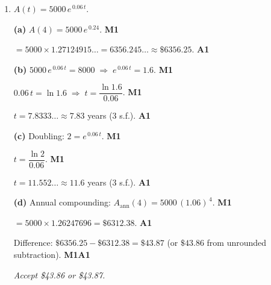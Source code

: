 \documentclass[12pt, twoside]{article}
\begin{document}
\begin{enumerate}[itemsep=0.3cm]
\textbf{(c)} $N(5) = 250\, e^{\,5k} = 250 \cdot 4^{\,5/3}$.
\hfill \textbf{M1}

$4^{\,5/3} = 10.0794\ldots$ \hfill \textbf{A1}

$N(5) = 250 \times 10.0794\ldots = 2519.84\ldots \approx 2520$.
\hfill \textbf{A1}

\medskip

\textbf{(d)} Set $250\, e^{\,kt} = 10\,000$, so
$e^{\,kt} = 40$. \hfill \textbf{M1}

$kt = \ln 40 \;\Rightarrow\; t = \dfrac{\ln 40}{k}
= \dfrac{3\ln 40}{\ln 4}$. \hfill \textbf{M1}

$t = 7.9829\ldots \approx 7.98$ hours (3 s.f.). \hfill \textbf{A1}

\emph{M1\,M1 may also be awarded for solving
$250\, e^{\,kt} = 10\,000$ with a graphing-calculator intersect or
solver.}

\medskip

\textbf{(e)} Doubling: $2N_0 = N_0\, e^{\,kt}
\;\Rightarrow\; e^{\,kt} = 2$. \hfill \textbf{M1}

$t = \dfrac{\ln 2}{k} = \dfrac{\ln 2}{(1/3)\ln 4}
= \dfrac{3\ln 2}{2\ln 2} = \dfrac{3}{2}$. \hfill \textbf{M1}

$t = 1.50$ hours. \hfill \textbf{A1}

\newpage

\item[5.] [Maximum mark: 12]

$A(t) = 5000\, e^{\,0.06\, t}$.

\textbf{(a)} $A(4) = 5000\, e^{\,0.24}$. \hfill \textbf{M1}

$= 5000 \times 1.27124915\ldots = 6356.245\ldots
\approx \$6356.25$. \hfill \textbf{A1}

\medskip

\textbf{(b)} $5000\, e^{\,0.06\, t} = 8000
\;\Rightarrow\; e^{\,0.06\, t} = 1.6$. \hfill \textbf{M1}

$0.06\, t = \ln 1.6 \;\Rightarrow\; t = \dfrac{\ln 1.6}{0.06}$.
\hfill \textbf{M1}

$t = 7.8333\ldots \approx 7.83$ years (3 s.f.). \hfill \textbf{A1}

\medskip

\textbf{(c)} Doubling: $2 = e^{\,0.06\, t}$. \hfill \textbf{M1}

$t = \dfrac{\ln 2}{0.06}$. \hfill \textbf{M1}

$t = 11.552\ldots \approx 11.6$ years (3 s.f.). \hfill \textbf{A1}

\medskip

\textbf{(d)} Annual compounding:
$A_{\text{ann}}(4) = 5000\,(1.06)^{\,4}$. \hfill \textbf{M1}

$= 5000 \times 1.26247696 = \$6312.38$. \hfill \textbf{A1}

Difference: $\$6356.25 - \$6312.38 = \$43.87$
\;(or $\$43.86$ from unrounded subtraction). \hfill \textbf{M1\;A1}

\emph{Accept \$43.86 or \$43.87.}

\end{enumerate}
\end{document}
